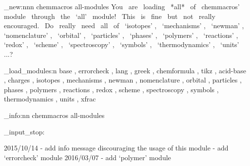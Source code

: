 %
%
%
%
%

\msg_new:nnn {chemmacros} {all-modules}
  {
    You~ are~ loading~ *all*~ of~ chemmacros'~ module~ through~ the~ `all'~
    module!~ This~ is~ fine~ but~ not~ really~ encouraged.~ Do~ really~ need~
    all~ of~ `isotopes' ,~ `mechanisms' ,~ `newman' ,~ `nomenclature' ,~
    `orbital' ,~ `particles' ,~ `phases' ,~ `polymers' ,~ `reactions' ,~
    `redox' ,~ `scheme' ,~ `spectroscopy' ,~ `symbols' ,~ `thermodynamics' ,~
    `units' ...?
  }

\chemmacros_load_modules:n
  {
     base ,
     errorcheck ,
     lang ,
     greek ,
     chemformula ,
     tikz ,
     acid-base ,
     charges ,
     isotopes ,
     mechanisms ,
     newman ,
     nomenclature ,
     orbital ,
     particles ,
     phases ,
     polymers ,
     reactions ,
     redox ,
     scheme ,
     spectroscopy ,
     symbols ,
     thermodynamics ,
     units ,
     xfrac
  }

\msg_info:nn {chemmacros} {all-modules}

\file_input_stop:

2015/10/14 - add info message discouraging the usage of this module
           - add `errorcheck' module
2016/03/07 - add `polymer' module
